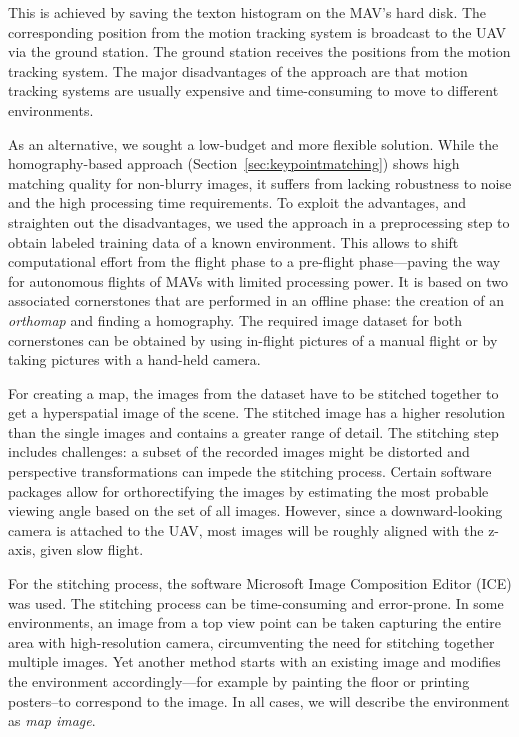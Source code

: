 \documentclass{report}
\begin{document}
This is achieved by saving the texton histogram on the MAV's hard
disk. The corresponding position from the motion tracking system is
broadcast to the UAV via the ground station. The ground station
receives the positions from the motion tracking system.  The major
disadvantages of the approach are that motion tracking systems are
usually expensive and time-consuming to move to different
environments.

As an alternative, we sought a low-budget and more flexible
solution. While the homography-based approach
(Section~\ref{sec:keypointmatching}) shows high matching quality for
non-blurry images, it suffers from lacking robustness to noise and the
high processing time requirements. To exploit the advantages, and
straighten out the disadvantages, we used the approach in a
preprocessing step to obtain labeled training data of a known
environment. This allows to shift computational effort from the flight
phase to a pre-flight phase---paving the way for autonomous flights of
MAVs with limited processing power. It is based on two associated
cornerstones that are performed in an offline phase: the creation of
an \emph{orthomap} and finding a homography. The required image
dataset for both cornerstones can be obtained by using in-flight
pictures of a manual flight or by taking pictures with a hand-held
camera.

For creating a map, the images from the dataset have to be stitched
together to get a hyperspatial image of the scene. The stitched image
has a higher resolution than the single images and contains a greater
range of detail. The stitching step includes challenges: a subset of
the recorded images might be distorted and perspective transformations
can impede the stitching process. Certain software packages allow for
orthorectifying the images by estimating the most probable viewing
angle based on the set of all images. However, since a
downward-looking camera is attached to the UAV, most images will be
roughly aligned with the z-axis, given slow flight.

For the stitching process, the software Microsoft Image Composition
Editor (ICE) was used. The stitching process can be time-consuming and
error-prone. In some environments, an image from a top view point can
be taken capturing the entire area with high-resolution camera,
circumventing the need for stitching together multiple images. Yet
another method starts with an existing image and modifies the
environment accordingly---for example by painting the floor or
printing posters--to correspond to the image. In all cases, we will
describe the environment as \emph{map image}.
\end{document}
